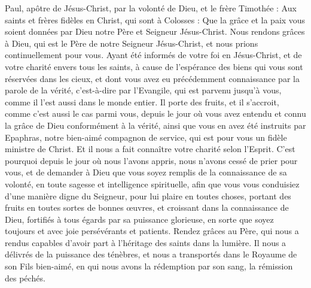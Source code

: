 \begin{multicols}{2}
\TextTitle{[Introduction]}
\VerseOne{}Paul, apôtre de Jésus-Christ, par la volonté de Dieu, et le frère Timothée :
Aux saints et frères fidèles en Christ, qui sont à Colosses : Que la grâce et la paix vous soient données par Dieu notre Père et Seigneur Jésus-Christ.
Nous rendons grâces à Dieu, qui est le Père de notre Seigneur Jésus-Christ, et nous prions continuellement pour vous.
Ayant été informés de votre foi en Jésus-Christ, et de votre charité envers tous les saints,
à cause de l'espérance des biens qui vous sont réservées dans les cieux, et dont vous avez eu précédemment connaissance par la parole de la vérité, c'est-à-dire par l'Evangile,
qui est parvenu jusqu'à vous, comme il l'est aussi dans le monde entier. Il porte des fruits, et il s’accroit, comme c’est aussi le cas parmi vous, depuis le jour où vous avez entendu et connu la grâce de Dieu conformément à la vérité,
ainsi que vous en avez été instruits par Epaphras, notre bien-aimé compagnon de service, qui est pour vous un fidèle ministre de Christ.
Et il nous a fait connaître votre charité selon l’Esprit.
C'est pourquoi depuis le jour où nous l’avons appris, nous n’avons cessé de prier pour vous, et de demander à Dieu que vous soyez remplis de la connaissance de sa volonté, en toute sagesse et intelligence spirituelle,
afin que vous vous conduisiez d’une manière digne du Seigneur, pour lui plaire en toutes choses, portant des fruits en toutes sortes de bonnes œuvres, et croissant dans la connaissance de Dieu,
fortifiés à tous égards par sa puissance glorieuse, en sorte que soyez toujours et avec joie persévérants et patients.
Rendez grâces au Père, qui nous a rendus capables d’avoir part à l'héritage des saints dans la lumière.
Il nous a délivrés de la puissance des ténèbres, et nous a transportés dans le Royaume de son Fils bien-aimé,
en qui nous avons la rédemption par son sang, la rémission des péchés.

\end{multicols}
